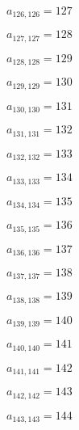 \documentclass[a4paper,12pt]{article}
\begin{document}
$a _{ 126, 126 } = 127$

$a _{ 127, 127 } = 128$

$a _{ 128, 128 } = 129$

$a _{ 129, 129 } = 130$

$a _{ 130, 130 } = 131$

$a _{ 131, 131 } = 132$

$a _{ 132, 132 } = 133$

$a _{ 133, 133 } = 134$

$a _{ 134, 134 } = 135$

$a _{ 135, 135 } = 136$

$a _{ 136, 136 } = 137$

$a _{ 137, 137 } = 138$

$a _{ 138, 138 } = 139$

$a _{ 139, 139 } = 140$

$a _{ 140, 140 } = 141$

$a _{ 141, 141 } = 142$

$a _{ 142, 142 } = 143$

$a _{ 143, 143 } = 144$
\end{document}
